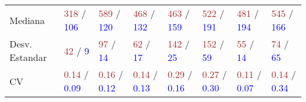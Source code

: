 \begin{table}[ht]
\begin{tabular}{p{2.4cm} p{1.3cm} p{1.3cm} p{1.3cm} p{1.3cm} p{1.3cm} p{1.3cm} p{1.3cm}}
		Mediana & \textcolor{brown}{318} / \textcolor{blue}{106} & \textcolor{brown}{589} / \textcolor{blue}{120} & \textcolor{brown}{468} / \textcolor{blue}{132} & \textcolor{brown}{463} / \textcolor{blue}{159} & \textcolor{brown}{522} / \textcolor{blue}{191} & \textcolor{brown}{481} / \textcolor{blue}{194} & \textcolor{brown}{545} / \textcolor{blue}{166} \\
		Desv. Estandar & \textcolor{brown}{42} / \textcolor{blue}{9} & \textcolor{brown}{97} / \textcolor{blue}{14} & \textcolor{brown}{62} / \textcolor{blue}{17} & \textcolor{brown}{142} / \textcolor{blue}{25} & \textcolor{brown}{152} / \textcolor{blue}{59} & \textcolor{brown}{55} / \textcolor{blue}{14} & \textcolor{brown}{74} / \textcolor{blue}{65} \\
		CV & \textcolor{brown}{0.14} / \textcolor{blue}{0.09} & \textcolor{brown}{0.16} / \textcolor{blue}{0.12} & \textcolor{brown}{0.14} / \textcolor{blue}{0.13} & \textcolor{brown}{0.29} / \textcolor{blue}{0.16} & \textcolor{brown}{0.27} / \textcolor{blue}{0.30} & \textcolor{brown}{0.11} / \textcolor{blue}{0.07} & \textcolor{brown}{0.14} / \textcolor{blue}{0.34} \\ [1ex]
		\hline
	\end{tabular}
	\label{table:tiempo_topo_mediana}
\end{table}


